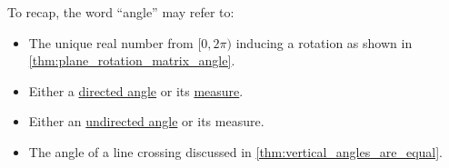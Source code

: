 \begin{remark}\label{rem:angle}
  To recap, the word \enquote{angle} may refer to:
  \begin{itemize}
    \item The unique real number from \( [0, 2\pi) \) inducing a rotation as shown in \cref{thm:plane_rotation_matrix_angle}.
    \item Either a \hyperref[def:angle]{directed angle} or its \hyperref[def:angle/measure]{measure}.
    \item Either an \hyperref[def:angle]{undirected angle} or its measure.
    \item The angle of a line crossing discussed in \cref{thm:vertical_angles_are_equal}.
  \end{itemize}
\end{remark}

